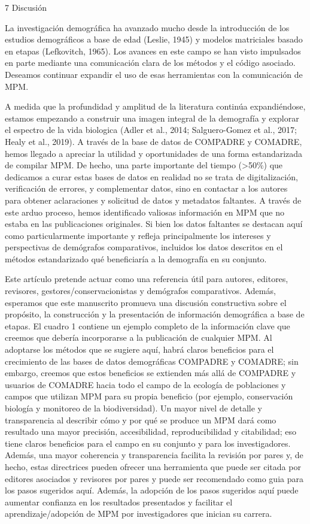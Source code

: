 \documentclass[
  12pt,
  letterpaper,
]{book}
\begin{document}
7 \textbar{} Discusión

La investigación demográfica ha avanzado mucho desde la introducción de
los estudios demográficos a base de edad (Leslie, 1945) y modelos
matriciales basado en etapas (Lefkovitch, 1965). Los avances en este
campo se han visto impulsados en parte mediante una comunicación clara
de los métodos y el código asociado. Deseamos continuar expandir el uso
de esas herramientas con la comunicación de MPM.

A medida que la profundidad y amplitud de la literatura continúa
expandiéndose, estamos empezando a construir una imagen integral de la
demografía y explorar el espectro de la vida biologica (Adler et al.,
2014; Salguero-Gomez et al., 2017; Healy et al., 2019). A través de la
base de datos de COMPADRE y COMADRE, hemos llegado a apreciar la
utilidad y oportunidades de una forma estandarizada de compilar MPM. De
hecho, una parte importante del tiempo (\textgreater50\%) que dedicamos
a curar estas bases de datos en realidad no se trata de digitalización,
verificación de errores, y complementar datos, sino en contactar a los
autores para obtener aclaraciones y solicitud de datos y metadatos
faltantes. A través de este arduo proceso, hemos identificado valiosas
información en MPM que no estaba en las publicaciones originales. Si
bien los datos faltantes se destacan aquí como particularmente
importante y refleja principalmente los intereses y perspectivas de
demógrafos comparativos, incluidos los datos descritos en el métodos
estandarizado qué beneficiaría a la demografía en su conjunto.

Este artículo pretende actuar como una referencia útil para autores,
editores, revisores, gestores/conservacionistas y demógrafos
comparativos. Además, esperamos que este manuscrito promueva una
discusión constructiva sobre el propósito, la construcción y la
presentación de información demográfica a base de etapas. El cuadro 1
contiene un ejemplo completo de la información clave que creemos que
debería incorporarse a la publicación de cualquier MPM. Al adoptarse los
métodos que se sugiere aquí, habrá claros beneficios para el crecimiento
de las bases de datos demográficas COMPADRE y COMADRE; sin embargo,
creemos que estos beneficios se extienden más allá de COMPADRE y
usuarios de COMADRE hacia todo el campo de la ecología de poblaciones y
campos que utilizan MPM para su propia beneficio (por ejemplo,
conservación biología y monitoreo de la biodiversidad). Un mayor nivel
de detalle y transparencia al describir cómo y por qué se produce un MPM
dará como resultado una mayor precisión, accesibilidad, reproducibilidad
y citabilidad; eso tiene claros beneficios para el campo en su conjunto
y para los investigadores. Además, una mayor coherencia y transparencia
facilita la revisión por pares y, de hecho, estas directrices pueden
ofrecer una herramienta que puede ser citada por editores asociados y
revisores por pares y puede ser recomendado como guia para los pasos
sugeridos aquí. Además, la adopción de los pasos sugeridos aquí puede
aumentar confianza en los resultados presentados y facilitar el
aprendizaje/adopción de MPM por investigadores que inician su carrera.
\end{document}
